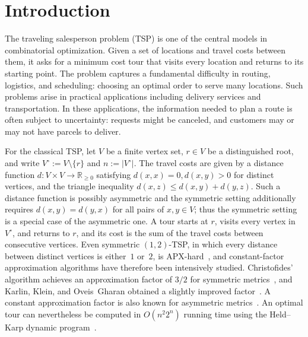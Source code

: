 \documentclass[12pt,a4paper,oneside]{report}
\begin{document}
\tableofcontents
\clearpage

\chapter{Introduction}\label{ch:intro}

The traveling salesperson problem (TSP) is one of the central models in
combinatorial optimization. Given a set of locations and travel costs between
them, it asks for a minimum cost tour that visits every location and returns to
its starting point. The problem captures a fundamental difficulty in routing, logistics, and scheduling:
choosing an optimal order to serve many locations.
Such problems arise in practical applications including delivery services
and transportation. In these applications, the information needed to plan a route
is often subject to uncertainty: requests might be canceled, and customers may or may not
have parcels to deliver.

For the classical TSP, let $V$ be a finite vertex set, $r \in V$ be a distinguished root,
and write $V^\circ := V \setminus \{r\}$ and $n := |V^\circ|$. 
The travel costs are given by a distance function $d: V \times V \rightarrow \mathbb{R}_{\ge 0}$ 
satisfying $d(x,x)=0, d(x,y)>0$ for distinct vertices, and the triangle inequality $d(x, z) \le d(x, y) + d(y,z)$. 
Such a distance function is possibly asymmetric and the symmetric setting additionally requires $d(x,y)=d(y,x)$ for all pairs of $x,y \in V$;
thus the symmetric setting is a special case of the asymmetric one.
A tour starts at $r$, visits every vertex in $V^\circ$, and returns to $r$, and its cost is the sum of the travel costs
between consecutive vertices. Even symmetric $(1,2)$-TSP, in which every
distance between distinct vertices is either~$1$ or~$2$, is
APX-hard~\cite{PapadimitriouYannakakis1993}, and constant-factor approximation
algorithms have therefore been intensively studied.
Christofides' algorithm achieves an approximation factor of $3/2$ for symmetric metrics~\cite{Christofides2022},
and Karlin, Klein, and Oveis~Gharan obtained a slightly improved factor~\cite{Karlin2021}.
A constant approximation factor is also known for asymmetric metrics~\cite{Svensson2020}.
An optimal tour can nevertheless be computed in $O(n^2 2^n)$ running time using the Held--Karp dynamic program~\cite{HeldKarp1962}.
\end{document}
